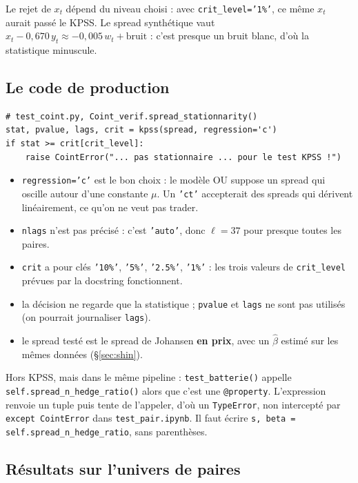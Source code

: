 \documentclass[11pt,a4paper]{article}
\newcommand{\code}[1]{\texttt{#1}}
\theoremstyle{definition}
\begin{document}
Le rejet de $x_t$ dépend du niveau choisi : avec \code{crit\_level='1\%'}, ce même $x_t$ aurait passé le KPSS. Le spread synthétique vaut $x_t - 0{,}670\,y_t \approx -0{,}005\,w_t + \text{bruit}$ : c'est presque un bruit blanc, d'où la statistique minuscule.

\subsection{Le code de production}

\begin{lstlisting}
# test_coint.py, Coint_verif.spread_stationnarity()
stat, pvalue, lags, crit = kpss(spread, regression='c')
if stat >= crit[crit_level]:
    raise CointError("... pas stationnaire ... pour le test KPSS !")
\end{lstlisting}

\begin{itemize}
\item \code{regression='c'} est le bon choix : le modèle OU suppose un spread qui oscille autour d'une constante $\mu$. Un \code{'ct'} accepterait des spreads qui dérivent linéairement, ce qu'on ne veut pas trader.
\item \code{nlags} n'est pas précisé : c'est \code{'auto'}, donc $\ell = 37$ pour presque toutes les paires.
\item \code{crit} a pour clés \code{'10\%'}, \code{'5\%'}, \code{'2.5\%'}, \code{'1\%'} : les trois valeurs de \code{crit\_level} prévues par la docstring fonctionnent.
\item la décision ne regarde que la statistique ; \code{pvalue} et \code{lags} ne sont pas utilisés (on pourrait journaliser \code{lags}).
\item le spread testé est le spread de Johansen \textbf{en prix}, avec un $\hat\beta$ estimé sur les mêmes données (\S\ref{sec:shin}).
\end{itemize}

\begin{piege}
Hors KPSS, mais dans le même pipeline : \code{test\_batterie()} appelle \code{self.spread\_n\_hedge\_ratio()} alors que c'est une \code{@property}. L'expression renvoie un tuple puis tente de l'appeler, d'où un \code{TypeError}, non intercepté par \code{except CointError} dans \code{test\_pair.ipynb}. Il faut écrire \code{s, beta = self.spread\_n\_hedge\_ratio}, sans parenthèses.
\end{piege}

\subsection{Résultats sur l'univers de paires}
\end{document}
